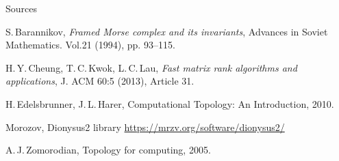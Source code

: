 \documentclass[10pt,xcolor={usenames}]{beamer}
\begin{document}

\begin{frame}{Sources}

\begin{thebibliography}{12}

 S.\,Barannikov, \textit{Framed Morse complex and its invariants}, Advances in Soviet Mathematics. Vol.21 (1994), pp. 93--115.

 H.\,Y.\,Cheung, T.\,C.\,Kwok, L.\,C.\,Lau, \textit{Fast matrix rank algorithms and applications}, J. ACM 60:5 (2013), Article 31.

 H.\,Edelsbrunner, J.\,L.\,Harer, Computational Topology: An Introduction, 2010.

 Morozov, Dionysus2 library \href{https://mrzv.org/software/dionysus2/}{https://mrzv.org/software/dionysus2/}

 A.\,J.\,Zomorodian, Topology for computing, 2005.

\end{thebibliography}

\end{frame}



%
%
\end{document}
